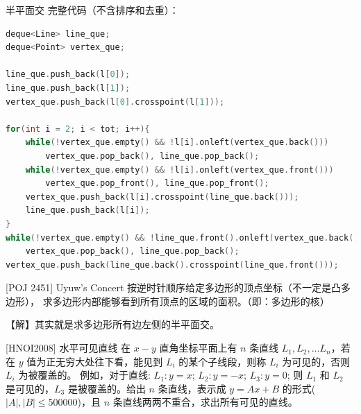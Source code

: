 \documentclass{beamer}
\begin{document}
\begin{frame}[fragile]{半平面交}
    \footnotesize
    完整代码（不含排序和去重）：

    \begin{lstlisting}[language=c++]
deque<Line> line_que;
deque<Point> vertex_que;

line_que.push_back(l[0]);
line_que.push_back(l[1]);
vertex_que.push_back(l[0].crosspoint(l[1]));

for(int i = 2; i < tot; i++){
    while(!vertex_que.empty() && !l[i].onleft(vertex_que.back()))
        vertex_que.pop_back(), line_que.pop_back();
    while(!vertex_que.empty() && !l[i].onleft(vertex_que.front()))
        vertex_que.pop_front(), line_que.pop_front();
    vertex_que.push_back(l[i].crosspoint(line_que.back()));
    line_que.push_back(l[i]);
}
while(!vertex_que.empty() && !line_que.front().onleft(vertex_que.back()))
    vertex_que.pop_back(), line_que.pop_back();
vertex_que.push_back(line_que.back().crosspoint(line_que.front()));
    \end{lstlisting}
\end{frame}

\begin{frame}{[POJ 2451] Uyuw's Concert}
    \small
    按逆时针顺序给定多边形的顶点坐标（不一定是凸多边形），
    求多边形内部能够看到所有顶点的区域的面积。（即：多边形的核）

    \vspace{1em}\pause
    【解】其实就是求多边形所有边左侧的半平面交。
\end{frame}

\begin{frame}{ [HNOI2008] 水平可见直线}
    \small
    在 $x-y$ 直角坐标平面上有 $n$ 条直线 $L_1,L_2,…L_n$，若在 $y$ 值为正无穷大处往下看，能见到 $L_i$ 的某个子线段，则称 $L_i$ 为可见的，否则 $L_i$ 为被覆盖的。
例如，对于直线:
$L_1:y=x$;
$L_2:y=-x$;
$L_3:y=0$;
则 $L_1$ 和 $L_2$ 是可见的，$L_3$ 是被覆盖的。给出 $n$ 条直线，表示成 $y=Ax+B$ 的形式($|A|,|B| \le 500000$)，且 $n$ 条直线两两不重合，求出所有可见的直线。
\end{frame}
\end{document}

